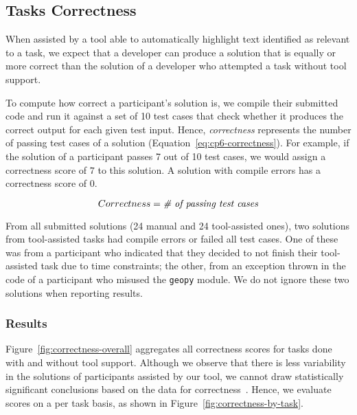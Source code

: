 
\subsection{Tasks Correctness}
\label{cp6:correctness}



When assisted by a tool able to automatically highlight text identified as relevant to a task, we expect that a developer can produce a solution 
that is equally or more correct than the solution of a developer who attempted a task without tool support. 


To compute how correct a participant's solution is, 
we compile their submitted code and run it against a set of 10 test cases that check whether it produces the correct output for each given test input. 
Hence, \textit{correctness} represents the number of passing test cases of a solution (Equation~\ref{eq:cp6-correctness}).
For example, if the solution of a participant passes 7 out of 10 test cases, we would assign a 
correctness score of $7$ to this solution. 
A solution with compile errors has a correctness score of $0$.


\begin{small}
\begin{equation}
    Correctness = \text{\textit{\# of passing test cases}}
    \label{eq:cp6-correctness}
\end{equation}
\end{small}



From all submitted solutions (24 manual and 24 tool-assisted ones), two 
solutions from tool-assisted tasks had compile errors or failed all test cases. 
One of these
was from a participant who indicated that they decided to not finish their tool-assisted task due to time constraints; 
the other, from an exception thrown in the code of a participant who misused the \texttt{geopy} module. We do not ignore these two solutions when reporting results.



\subsubsection{Results}


Figure~\ref{fig:correctness-overall} aggregates all correctness scores for tasks done with and without tool support.
Although we observe that there is less variability in the solutions of participants assisted by our tool,
we cannot draw statistically significant conclusions based on the data for correctness~\cite{Lazar2017-cp3}.
Hence, we evaluate scores on a per task basis, as shown in Figure~\ref{fig:correctness-by-task}.




